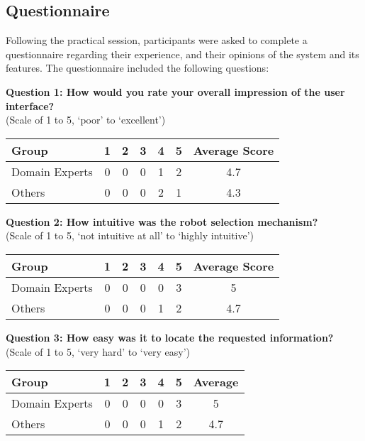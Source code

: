 \subsection{Questionnaire} \label{UserEvaluationQuestionnaire}
Following the practical session, participants were asked to complete a questionnaire regarding their experience, and their opinions of the system and its features. The questionnaire included the following questions:

\noindent\textbf{Question 1: How would you rate your overall impression of the user interface?}\\(Scale of 1 to 5, `poor' to `excellent')

\begin{center}
\begin{tabular}{ l c c c c c c }
 Group & 1 & 2 & 3 & 4 & 5 & Average Score \\ 
 \hline
 Domain Experts & 0 & 0 & 0 & 1 & 2 & 4.7 \\
 Others 		& 0 & 0 & 0 & 2 & 1 & 4.3 \\
\end{tabular}
\end{center}

\noindent\textbf{Question 2: How intuitive was the robot selection mechanism?}\\(Scale of 1 to 5, `not intuitive at all' to `highly intuitive')

\begin{center}
\begin{tabular}{ l c c c c c c }
 Group & 1 & 2 & 3 & 4 & 5 & Average Score \\ 
 \hline
 Domain Experts & 0 & 0 & 0 & 0 & 3 & 5 \\
 Others 		& 0 & 0 & 0 & 1 & 2 & 4.7 \\
\end{tabular}
\end{center}

\noindent\textbf{Question 3: How easy was it to locate the requested information?}\\(Scale of 1 to 5, `very hard' to `very easy')

\begin{center}
\begin{tabular}{ l c c c c c c }
 Group & 1 & 2 & 3 & 4 & 5 & Average \\ 
 \hline
 Domain Experts & 0 & 0 & 0 & 0 & 3 & 5 \\
 Others 		& 0 & 0 & 0 & 1 & 2 & 4.7 \\
\end{tabular}
\end{center}

